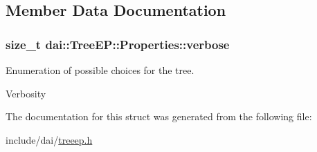 \subsection{Member Data Documentation}
\hypertarget{structdai_1_1TreeEP_1_1Properties_f41d83b6886eed09e080420be1fe0486}{
\subsubsection[verbose]{\setlength{\rightskip}{0pt plus 5cm}size\_\-t {\bf dai::TreeEP::Properties::verbose}}}
\label{structdai_1_1TreeEP_1_1Properties_f41d83b6886eed09e080420be1fe0486}


Enumeration of possible choices for the tree. 

Verbosity 

The documentation for this struct was generated from the following file:\begin{CompactItemize}
\item 
include/dai/\hyperlink{treeep_8h}{treeep.h}\end{CompactItemize}
